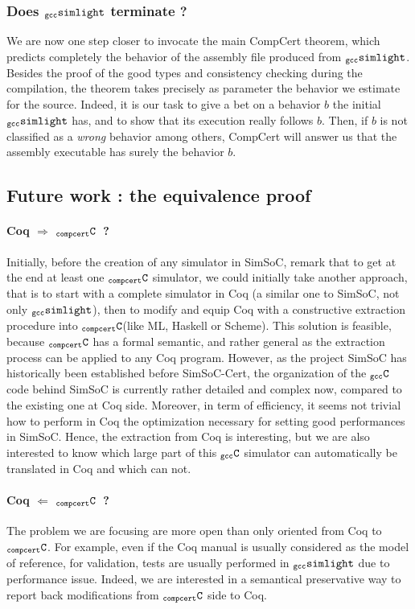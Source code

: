 \documentclass[a4paper, 11pt]{article}
\newcommand{\gccSL}{$_{\tt gcc}{\tt simlight}$\xspace}
\newcommand{\C}{$_{\tt compcert}{\tt C}$\xspace}
\newcommand{\gccC}{$_{\tt gcc}{\tt C}$\xspace}
\newcommand{\simsoc}{SimSoC\xspace}
\newcommand{\SScert}{SimSoC-Cert\xspace}
\begin{document}
\subsubsection{Does \gccSL terminate ?}
We are now one step closer to invocate the main CompCert theorem, which predicts completely the behavior of the assembly file produced from \gccSL. Besides the proof of the good types and consistency checking during the compilation, the theorem takes precisely as parameter the behavior we estimate for the source. Indeed, it is our task to give a bet on a behavior $b$ the initial \gccSL has, and to show that its execution really follows $b$. Then, if $b$ is not classified as a \emph{wrong} behavior among others, CompCert will answer us that the assembly executable has surely the behavior $b$.

\subsection{Future work : the equivalence proof}
\paragraph{Coq $\Longrightarrow$ \C~?}
Initially, before the creation of any simulator in \simsoc, remark that to get at the end at least one \C simulator, we could initially take another approach, that is to start with a complete simulator in Coq (a similar one to \simsoc, not only \gccSL), then to modify and equip Coq with a constructive extraction procedure into \C (like ML, Haskell or Scheme). This solution is feasible, because \C has a formal semantic, and rather general as the extraction process can be applied to any Coq program. However, as the project \simsoc has historically been established before \SScert, the organization of the \gccC code behind \simsoc is currently rather detailed and complex now, compared to the existing one at Coq side. Moreover, in term of efficiency, it seems not trivial how to perform in Coq the optimization necessary for setting good performances in SimSoC. Hence, the extraction from Coq is interesting, but we are also interested to know which large part of this \gccC simulator can automatically be translated in Coq and which can not.

\paragraph{Coq $\Longleftarrow$ \C~?}
The problem we are focusing are more open than only oriented from Coq to \C. For example, even if the Coq manual is usually considered as the model of reference, for validation, tests are usually performed in \gccSL due to performance issue. Indeed, we are interested in a semantical preservative way to report back modifications from \C side to Coq. 
\end{document}
